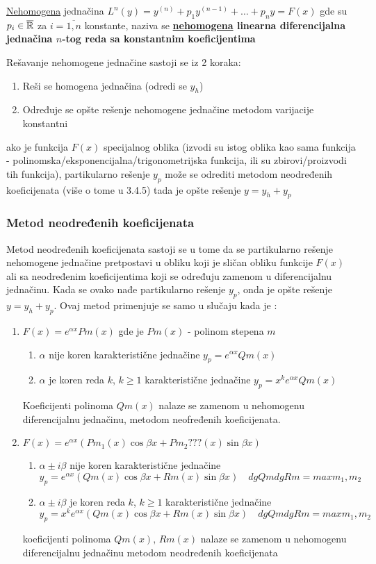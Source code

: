 \begin{definition}
	\underline{Nehomogena} jednačina $L^n(y) = y^{(n)} + p_1 y^{(n-1)} + \ldots + p_n y = F(x)$ gde su $p_i \in \overline{\mathbb{R}}$ za $i = \overline{1, n}$ konstante, naziva se \textbf{\underline{nehomogena} linearna diferencijalna jednačina $n$-tog reda sa konstantnim koeficijentima}
\end{definition}
Rešavanje nehomogene jednačine sastoji se iz 2 koraka:
\begin{enumerate}[label = \arabic*)]
	\item Reši se homogena jednačina (odredi se $y_h$)
	\item Određuje se opšte rešenje nehomogene jednačine metodom varijacije konstantni
\end{enumerate}
\Napomena ako je funkcija $F(x)$ specijalnog oblika (izvodi su istog oblika kao sama funkcija - polinomska/eksponencijalna/trigonometrijska funkcija, ili su zbirovi/proizvodi tih funkcija), partikularno rešenje $y_p$ može se odrediti metodom neodređenih koeficijenata (više o tome u 3.4.5) tada je opšte rešenje $y = y_h + y_p$
\subsubsection{Metod neodređenih koeficijenata}
	Metod neodređenih koeficijenata sastoji se u tome da se partikularno rešenje nehomogene jednačine pretpostavi u obliku koji je sličan obliku funkcije $F(x)$ ali sa neodređenim koeficijentima koji se određuju zamenom u diferencijalnu jednačinu. Kada se ovako nađe partikularno rešenje $y_p$, onda je opšte rešenje $y = y_h + y_p$.
Ovaj metod primenjuje se samo u slučaju kada je
:
\begin{enumerate}[label = \arabic*)]
	\item 
		$F(x) = e^{\alpha x} Pm(x)$ gde je $Pm(x)$ - polinom stepena $m$
		\begin{enumerate}[label = \alph*)]
			\item  $\alpha$ nije koren karakteristične jednačine $y_p = e^{\alpha x} Qm(x)$
			\item  $\alpha$ je koren reda $k$, $k \geq 1$ karakteristične jednačine $y_p = x^k e^{\alpha x} Qm(x)$
		\end{enumerate}
		Koeficijenti polinoma $Qm(x)$ nalaze se zamenom u nehomogenu diferencijalnu jednačinu, metodom neofređenih koeficijenata.
	
	\item 
		$F(x) = e^{\alpha x} (Pm_1(x)\cos \beta x + Pm_2???(x)\sin \beta x)$
		\begin{enumerate}[label = \alph*)]
			\item $\alpha \pm i \beta$ nije koren karakteristične jednačine $y_p = e^{\alpha x} (Qm(x)  \cos \beta x + Rm(x) \sin \beta x) \quad dgQm dgRm = max{m_1, m_2}$
			\item  $\alpha \pm i \beta$ je koren reda $k$, $k \geq 1$ karakteristične jednačine $y_p = x^k e^{\alpha x} (Qm(x)  \cos \beta x + Rm(x) \sin \beta x) \quad dgQm dgRm = max{m_1, m_2}$
		\end{enumerate}
		koeficijenti polinoma $Qm(x), \, Rm(x)$ nalaze se zamenom u nehomogenu diferencijalnu jednačinu metodom neodređenih koeficijenata
\end{enumerate}